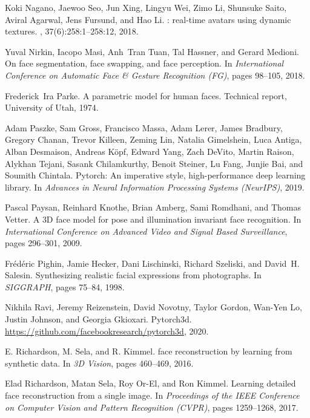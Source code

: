 \documentclass[final]{cvpr}
\begin{document}
{\begin{thebibliography}{10}
Koki Nagano, Jaewoo Seo, Jun Xing, Lingyu Wei, Zimo Li, Shunsuke Saito, Aviral
  Agarwal, Jens Fursund, and Hao Li.
: real-time avatars using dynamic textures.
, 37(6):258:1--258:12, 2018.

Yuval Nirkin, Iacopo Masi, Anh~Tran Tuan, Tal Hassner, and Gerard Medioni.
\newblock On face segmentation, face swapping, and face perception.
\newblock In {\em International Conference on Automatic Face \& Gesture
  Recognition (FG)}, pages 98--105, 2018.

Frederick~Ira Parke.
\newblock A parametric model for human faces.
\newblock Technical report, University of Utah, 1974.

Adam Paszke, Sam Gross, Francisco Massa, Adam Lerer, James Bradbury, Gregory
  Chanan, Trevor Killeen, Zeming Lin, Natalia Gimelshein, Luca Antiga, Alban
  Desmaison, Andreas K{\"o}pf, Edward Yang, Zach DeVito, Martin Raison, Alykhan
  Tejani, Sasank Chilamkurthy, Benoit Steiner, Lu Fang, Junjie Bai, and Soumith
  Chintala.
\newblock Pytorch: An imperative style, high-performance deep learning library.
\newblock In {\em Advances in Neural Information Processing Systems (NeurIPS)},
  2019.

Pascal Paysan, Reinhard Knothe, Brian Amberg, Sami Romdhani, and Thomas Vetter.
\newblock A {3D} face model for pose and illumination invariant face
  recognition.
\newblock In {\em International Conference on Advanced Video and Signal Based
  Surveillance}, pages 296--301, 2009.

Fr{\'e}d{\'e}ric Pighin, Jamie Hecker, Dani Lischinski, Richard Szeliski, and
  David~H. Salesin.
\newblock Synthesizing realistic facial expressions from photographs.
\newblock In {\em SIGGRAPH}, pages 75--84, 1998.

Nikhila Ravi, Jeremy Reizenstein, David Novotny, Taylor Gordon, Wan-Yen Lo,
  Justin Johnson, and Georgia Gkioxari.
\newblock Pytorch3d.
\newblock \url{https://github.com/facebookresearch/pytorch3d}, 2020.

E. Richardson, M. Sela, and R. Kimmel.
 face reconstruction by learning from synthetic data.
\newblock In {\em {3D} Vision}, pages 460--469, 2016.

Elad Richardson, Matan Sela, Roy Or-El, and Ron Kimmel.
\newblock Learning detailed face reconstruction from a single image.
\newblock In {\em Proceedings of the IEEE Conference on Computer Vision and
  Pattern Recognition (CVPR)}, pages 1259--1268, 2017.


\end{thebibliography}}
\end{document}
